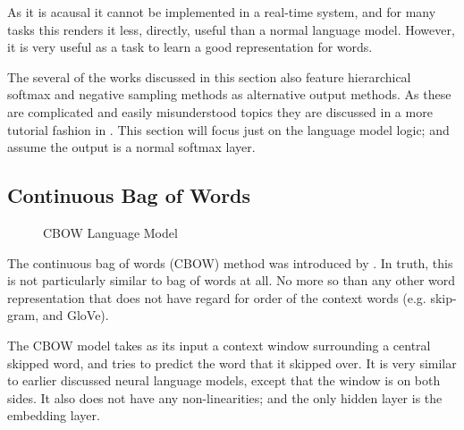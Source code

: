 \documentclass[parskip]{komatufte}
\begin{document}
As it is acausal it cannot be implemented in a real-time system, and for many tasks this renders it less, directly, useful than a normal language model. 
However, it is very useful as a task to learn a good representation for words.




The several of the works discussed in this section also feature hierarchical softmax and negative sampling methods as alternative output methods.
As these are complicated and easily misunderstood topics they are discussed in a more tutorial fashion in .
This section will focus just on the language model logic; and assume the output is a normal softmax layer.

\subsection{Continuous Bag of Words}\label{sec:cbow}
\begin{figure}
	\caption{CBOW Language Model}
	\label{fig:cbow}
	\centering
	 
\end{figure}

The continuous bag of words (CBOW) method was introduced by .
In truth, this is not particularly similar to bag of words at all.
No more so than any other word representation that does not have regard for order of the context words (e.g. skip-gram, and GloVe).

The CBOW model takes as its input a context window surrounding a central skipped word, and tries to predict the word that it skipped over.
It is very similar to earlier discussed neural language models, except that the window is on both sides.
It also does not have any non-linearities;
and the only hidden layer is the embedding layer.
\end{document}
